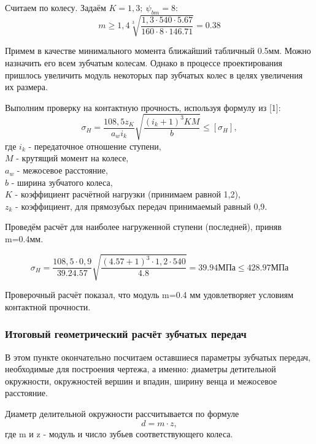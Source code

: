 \documentclass[14pt,a4paper,russian]{scrartcl}
\begin{document}
        Считаем по колесу. Задаём \( K=1,3;\ \psi_{bm}=8 \):
        \[ m \geq 1,4\sqrt[3]{\frac{1,3\cdot 540\cdot 5.67}{160\cdot 8\cdot 146.71}}=0.38 \]
        
        Примем в качестве минимального момента ближайший табличный 0.5мм. Можно назначить его
        всем зубчатым колесам. Однако в процессе проектирования пришлось увеличить модуль некоторых
        пар зубчатых колес в целях увеличения их размера.\par 
        
        Выполним проверку на контактную прочность, используя формулу из [1]:
        \[ \sigma_H = \frac{108,5 z_K}{a_w i_{k}}\sqrt{\frac{(i_k+1)^3KM}{b}} \leq [\sigma_H], \]
        где \( i_k \) - передаточное отношение ступени,\\
            \( M \) - крутящий момент на колесе,\\
            \( a_w \) - межосевое расстояние,\\
            \( b \) - ширина зубчатого колеса,\\
            \( K \) - коэффициент расчётной нагрузки (принимаем равной 1,2),\\
            \( z_k \) - коэффициент, для прямозубых передач принимаемый равный 0,9.\par
        
            Проведём расчёт для наиболее нагруженной ступени (последней), приняв m=0.4мм.

            \[ \sigma_H = \frac{108,5\cdot 0,9}{39.2 4.57}
            \sqrt{\frac{(4.57+1)^3\cdot 1,2\cdot 540}{4.8}} = 39.94 \text{МПа}\leq 428.97 \text{МПа}\]
            
        Проверочный расчёт показал, что модуль m=0.4 мм удовлетворяет условиям контактной прочности.

    
    \subsubsection{Итоговый геометрический расчёт зубчатых передач}
        В этом пункте окончательно посчитаем оставшиеся параметры зубчатых передач,
        необходимые для построения чертежа, а именно: диаметры детительной окружности, окружностей вершин
        и впадин, ширину венца и межосевое расстояние.\par

        Диаметр делительной окружности рассчитывается по формуле
        \[ d = m\cdot z, \]
        где m и z - модуль и число зубьев соответствующего колеса.\par
\end{document}
